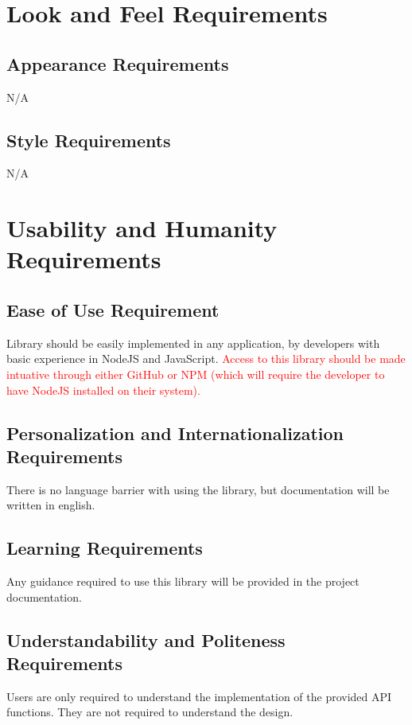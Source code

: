 \documentclass[12pt]{article}
\begin{document}
  

  
\section*{}

\section {Look and Feel Requirements}

\subsection {Appearance Requirements}
N/A

\subsection {Style Requirements}
N/A

\section {Usability and Humanity Requirements}

\subsection {Ease of Use Requirement}
Library should be easily implemented in any application, by developers with basic experience in NodeJS and JavaScript. \textcolor{red}{Access to this library should be made intuative through either GitHub or NPM (which will require the developer to have NodeJS installed on their system).}


\subsection {Personalization and Internationalization Requirements}
There is no language barrier with using the library, but documentation will be written in english.

\subsection {Learning Requirements}
Any guidance required to use this library will be provided in the project documentation.

\subsection {Understandability and Politeness Requirements}
Users are only required to understand the implementation of the provided API functions. They are not required to understand the design.
\end{document}
